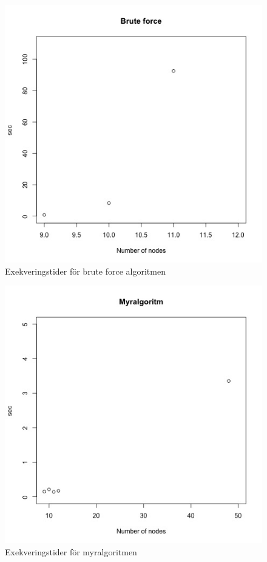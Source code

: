 \documentclass[11pt]{article}
\begin{document}
\begin{figure}
  \includegraphics[width=\linewidth]{plots/bf.jpg}
  \caption{Exekveringstider för brute force algoritmen}
  \label{fig:plot_brute_force}
\end{figure}


\begin{figure}
  \includegraphics[width=\linewidth]{plots/ant.jpg}
  \caption{Exekveringstider för myralgoritmen}
  \label{fig:plot_ant}
\end{figure}
\end{document}
